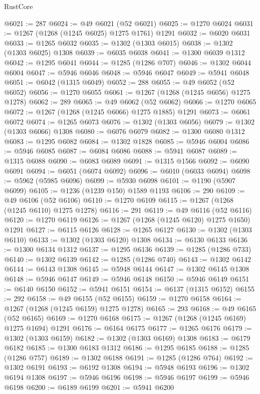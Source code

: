 \begin{lexlean}{RustCore}
\begin{coremodule}
@6021 := 287
@6024 := @49 @6021 (@52 @6021)
@6025 := @1270 @6024
@6031 := @1267 (@1268 (@1245 @6025) @1275 @1761) @1291
@6032 := @6020 @6031
@6033 := @1265 @6032
@6035 := @1302 (@1303 @6015)
@6038 := @1302 (@1303 @6025) @1308
@6039 := @6035 @6038
@6041 := @1300 @6039 @1312
@6042 := @1295 @6041
@6044 := @1285 (@1286 @707)
@6046 := @1302 @6044 @6004
@6047 := @5946 @6046
@6048 := @5946 @6047
@6049 := @5941 @6048
@6051 := @6042 (@1315 @6049)
@6052 := 288
@6055 := @49 @6052 (@52 @6052)
@6056 := @1270 @6055
@6061 := @1267 (@1268 (@1245 @6056) @1275 @1278)
@6062 := 289
@6065 := @49 @6062 (@52 @6062)
@6066 := @1270 @6065
@6072 := @1267 (@1268 (@1245 @6066) @1275 @1885) @1291
@6073 := @6061 @6072
@6074 := @1265 @6073
@6076 := @1302 (@1303 @6056)
@6079 := @1302 (@1303 @6066) @1308
@6080 := @6076 @6079
@6082 := @1300 @6080 @1312
@6083 := @1295 @6082
@6084 := @1302 @1828
@6085 := @5946 @6004
@6086 := @5946 @6085
@6087 := @6084 @6086
@6088 := @5941 @6087
@6089 := @1315 @6088
@6090 := @6083 @6089
@6091 := @1315 @1566
@6092 := @6090 @6091
@6094 := @6051 (@6074 @6092)
@6096 := @6010 (@6033 @6094)
@6098 := @5962 (@5985 @6096)
@6099 := @5930 @6098
@6101 := @1190 (@5907 @6099)
@6105 := @1236 (@1239 @150) @1589 @1193
@6106 := 290
@6109 := @49 @6106 (@52 @6106)
@6110 := @1270 @6109
@6115 := @1267 (@1268 (@1245 @6110) @1275 @1278)
@6116 := 291
@6119 := @49 @6116 (@52 @6116)
@6120 := @1270 @6119
@6126 := @1267 (@1268 (@1245 @6120) @1275 @1650) @1291
@6127 := @6115 @6126
@6128 := @1265 @6127
@6130 := @1302 (@1303 @6110)
@6133 := @1302 (@1303 @6120) @1308
@6134 := @6130 @6133
@6136 := @1300 @6134 @1312
@6137 := @1295 @6136
@6139 := @1285 (@1286 @733)
@6140 := @1302 @6139
@6142 := @1285 (@1286 @740)
@6143 := @1302 @6142
@6144 := @6143 @1308
@6145 := @5948 @6144
@6147 := @1302 @6145 @1308
@6148 := @5946 @6147
@6149 := @5946 @6148
@6150 := @5946 @6149
@6151 := @6140 @6150
@6152 := @5941 @6151
@6154 := @6137 (@1315 @6152)
@6155 := 292
@6158 := @49 @6155 (@52 @6155)
@6159 := @1270 @6158
@6164 := @1267 (@1268 (@1245 @6159) @1275 @1278)
@6165 := 293
@6168 := @49 @6165 (@52 @6165)
@6169 := @1270 @6168
@6175 := @1267 (@1268 (@1245 @6169) @1275 @1694) @1291
@6176 := @6164 @6175
@6177 := @1265 @6176
@6179 := @1302 (@1303 @6159)
@6182 := @1302 (@1303 @6169) @1308
@6183 := @6179 @6182
@6185 := @1300 @6183 @1312
@6186 := @1295 @6185
@6188 := @1285 (@1286 @757)
@6189 := @1302 @6188
@6191 := @1285 (@1286 @764)
@6192 := @1302 @6191
@6193 := @6192 @1308
@6194 := @5948 @6193
@6196 := @1302 @6194 @1308
@6197 := @5946 @6196
@6198 := @5946 @6197
@6199 := @5946 @6198
@6200 := @6189 @6199
@6201 := @5941 @6200

\end{coremodule}
\end{lexlean}
